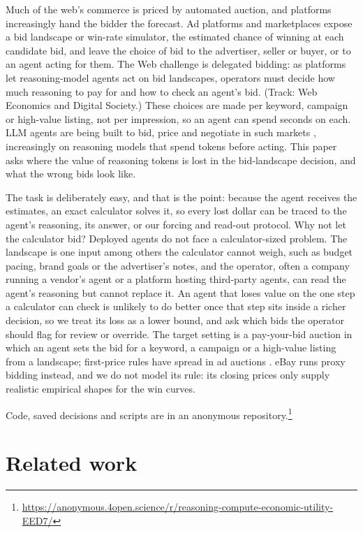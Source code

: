 \documentclass[sigconf,review,anonymous]{acmart}
\begin{document}
Much of the web's commerce is priced by automated auction, and platforms increasingly hand the bidder the forecast. Ad platforms and marketplaces expose a bid landscape or win-rate simulator, the estimated chance of winning at each candidate bid, and leave the choice of bid to the advertiser, seller or buyer, or to an agent acting for them. The Web challenge is delegated bidding: as platforms let reasoning-model agents act on bid landscapes, operators must decide how much reasoning to pay for and how to check an agent's bid. (Track: Web Economics and Digital Society.) These choices are made per keyword, campaign or high-value listing, not per impression, so an agent can spend seconds on each. LLM agents are being built to bid, price and negotiate in such markets \cite{chen2024aucarena,zhu2024synthetic,ahmed2026bazaar}, increasingly on reasoning models that spend tokens before acting. This paper asks where the value of reasoning tokens is lost in the bid-landscape decision, and what the wrong bids look like.

The task is deliberately easy, and that is the point: because the agent receives the estimates, an exact calculator solves it, so every lost dollar can be traced to the agent's reasoning, its answer, or our forcing and read-out protocol. Why not let the calculator bid? Deployed agents do not face a calculator-sized problem. The landscape is one input among others the calculator cannot weigh, such as budget pacing, brand goals or the advertiser's notes, and the operator, often a company running a vendor's agent or a platform hosting third-party agents, can read the agent's reasoning but cannot replace it. An agent that loses value on the one step a calculator can check is unlikely to do better once that step sits inside a richer decision, so we treat its loss as a lower bound, and ask which bids the operator should flag for review or override. The target setting is a pay-your-bid auction in which an agent sets the bid for a keyword, a campaign or a high-value listing from a landscape; first-price rules have spread in ad auctions \cite{despotakis2021firstprice}. eBay runs proxy bidding instead, and we do not model its rule: its closing prices only supply realistic empirical shapes for the win curves.

Code, saved decisions and scripts are in an anonymous repository.\footnote{\url{https://anonymous.4open.science/r/reasoning-compute-economic-utility-EED7/}}



\section{Related work}
\end{document}
